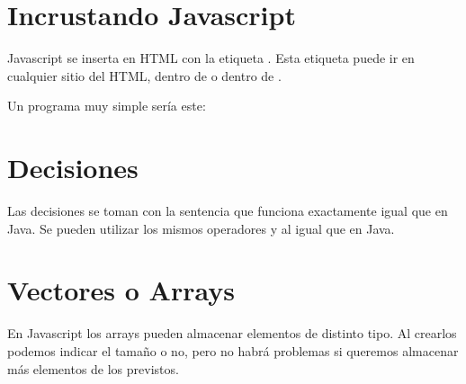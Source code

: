 \documentclass[letterpaper,10pt,spanish]{sphinxmanual}
\begin{document}
\section{Incrustando Javascript}
\label{\detokenize{tema4:incrustando-javascript}}
Javascript se inserta en HTML con la etiqueta . Esta etiqueta puede ir en cualquier sitio del HTML, dentro de  o dentro de .

Un programa muy simple sería este:

\begin{sphinxVerbatim}[commandchars=\\\{\}]
     
\end{sphinxVerbatim}


\section{Decisiones}
\label{\detokenize{tema4:decisiones}}
Las decisiones se toman con la sentencia  que funciona exactamente igual que en Java. Se pueden utilizar los mismos operadores \sphinxcode{\&\&} y \sphinxcode{\textbar{}\textbar{}} al igual que en Java.

\begin{sphinxVerbatim}[commandchars=\\\{\}]
        
     
  
     
\end{sphinxVerbatim}


\section{Vectores o Arrays}
\label{\detokenize{tema4:vectores-o-arrays}}
En Javascript los arrays pueden almacenar elementos de distinto tipo. Al crearlos podemos indicar el tamaño o no, pero no habrá problemas si queremos almacenar más elementos de los previstos.
\end{document}
